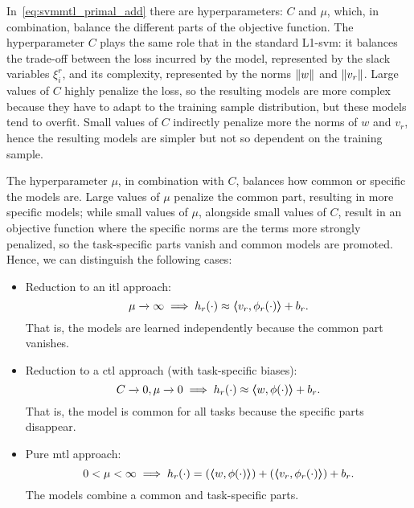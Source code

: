%
In~\eqref{eq:svmmtl_primal_add} there are hyperparameters: $C$ and $\mu$, which, in combination, balance the different parts of the objective function. 
%
The hyperparameter $C$ plays the same role that in the standard L1-\acrshort{svm}: it balances the trade-off between the loss incurred by the model, represented by the slack variables $\xi_i^r$, and its complexity, represented by the norms $\left\lVert{w}\right\rVert$ and $\left\lVert{v}_r\right\rVert$. Large values of $C$ highly penalize the loss, so the resulting models are more complex because they have to adapt to the training sample distribution, but these models tend to overfit. Small values of $C$ indirectly penalize more the norms of $w$ and $v_r$, hence the resulting models are simpler but not so dependent on the training sample.

%
The hyperparameter $\mu$, in combination with $C$, balances how common or specific the models are. 
Large values of $\mu$ penalize the common part, resulting in more specific models; while small values of $\mu$, alongside small values of $C$, result in an objective function where the specific norms are the terms more strongly penalized, so the task-specific parts vanish and common models are promoted.
Hence, we can distinguish the following cases:
\begin{itemize}
    \item Reduction to an \acrshort{itl} approach:
    $$\mu \xrightarrow[]{} \infty \implies h_r(\cdot) \approx \bm{\left\langle} {v}_r, \phi_r(\cdot) \bm{\right\rangle} + b_r .$$
    That is, the models are learned independently because the common part vanishes.
    \item Reduction to a \acrshort{ctl} approach (with task-specific biases): 
    $$C \xrightarrow[]{} 0, \mu \xrightarrow[]{} 0 \implies h_r(\cdot) \approx \bm{\left\langle} w, \phi(\cdot) \bm{\right\rangle} + b_r .$$
    That is, the model is common for all tasks because the specific parts disappear.
    \item Pure \acrshort{mtl} approach:
    $$ 0 < \mu < \infty \implies h_r(\cdot) =(\bm{\left\langle} w, \phi(\cdot) \bm{\right\rangle} ) + (\bm{\left\langle} {v}_r, \phi_r(\cdot) \bm{\right\rangle}) + b_r .$$
    The models combine a common and task-specific parts.
\end{itemize}

